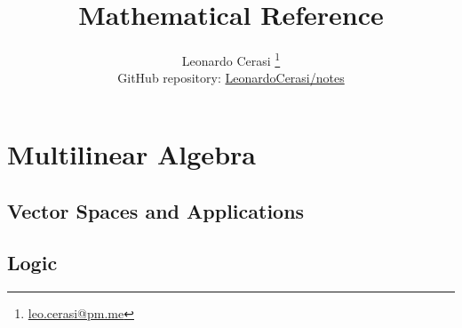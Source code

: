 \documentclass[a4paper, 12pt]{book}
\title{\Huge \sffamily \textbf{Mathematical Reference}}
\author{Leonardo Cerasi%
	\thanks{\scriptsize\href{mailto:leonardo.cerasi@studenti.unimi.it}{leo.cerasi@pm.me}}\\
	\small GitHub repository: \href{https://github.com/LeonardoCerasi/notes}{LeonardoCerasi/notes}}
\date{}
\begin{document}
\frontmatter

\maketitle

\toc

\pagestyle{contents}

\mainmatter



\part{Multilinear Algebra}
\pagestyle{body}

\chapter{Vector Spaces and Applications}


\begin{appendices}
\pagestyle{append}

\chapter{Logic}


\clearpage
\end{appendices}

\printindex
\end{document}
